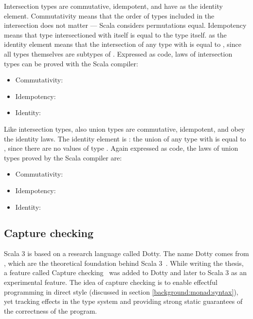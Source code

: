 Intersection types are commutative, idempotent, and have  as the identity element. Commutativity means that the order of types included in the intersection does not matter --- Scala considers permutations equal. Idempotency means that type intersectioned with itself is equal to the type itself.  as the identity element means that the intersection of any type  with  is equal to , since all types themselves are subtypes of . Expressed as code, laws of intersection types can be proved with the Scala compiler:
\begin{itemize}
    \item Commutativity: 
    \item Idempotency: 
    \item Identity: 
\end{itemize}

Like intersection types, also union types are commutative, idempotent, and obey the identity laws. The identity element is : the union of any type  with  is equal to , since there are no values of type . Again expressed as code, the laws of union types proved by the Scala compiler are:
\begin{itemize}
    \item Commutativity: 
    \item Idempotency: 
    \item Identity: 
\end{itemize}


\subsection{Capture checking}
Scala 3 is based on a research language called Dotty. The name Dotty comes from , which are the theoretical foundation behind Scala 3~\cite{essence-of-dot}. While writing the thesis, a feature called Capture checking~\cite{capture-checking} was added to Dotty and later to Scala 3 as an experimental feature. The idea of capture checking is to enable effectful programming in direct style (discussed in section \ref{background:monad:syntax}), yet tracking effects in the type system and providing strong static guarantees of the correctness of the program.

